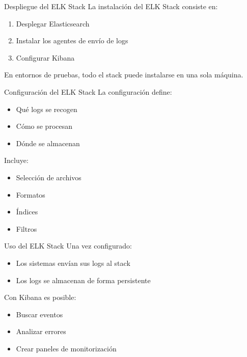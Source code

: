 \documentclass{beamer}
\begin{document}
\begin{frame}{Despliegue del ELK Stack}
La instalación del ELK Stack consiste en:
\begin{enumerate}
    \item Desplegar Elasticsearch
    \item Instalar los agentes de envío de logs
    \item Configurar Kibana
\end{enumerate}

\vspace{0.3cm}
En entornos de pruebas, todo el stack puede instalarse en una sola máquina.
\end{frame}

\begin{frame}{Configuración del ELK Stack}
La configuración define:
\begin{itemize}
    \item Qué logs se recogen
    \item Cómo se procesan
    \item Dónde se almacenan
\end{itemize}

\vspace{0.3cm}
Incluye:
\begin{itemize}
    \item Selección de archivos
    \item Formatos
    \item Índices
    \item Filtros
\end{itemize}
\end{frame}

\begin{frame}{Uso del ELK Stack}
Una vez configurado:
\begin{itemize}
    \item Los sistemas envían sus logs al stack
    \item Los logs se almacenan de forma persistente
\end{itemize}

\vspace{0.3cm}
Con Kibana es posible:
\begin{itemize}
    \item Buscar eventos
    \item Analizar errores
    \item Crear paneles de monitorización
\end{itemize}
\end{frame}
\end{document}
